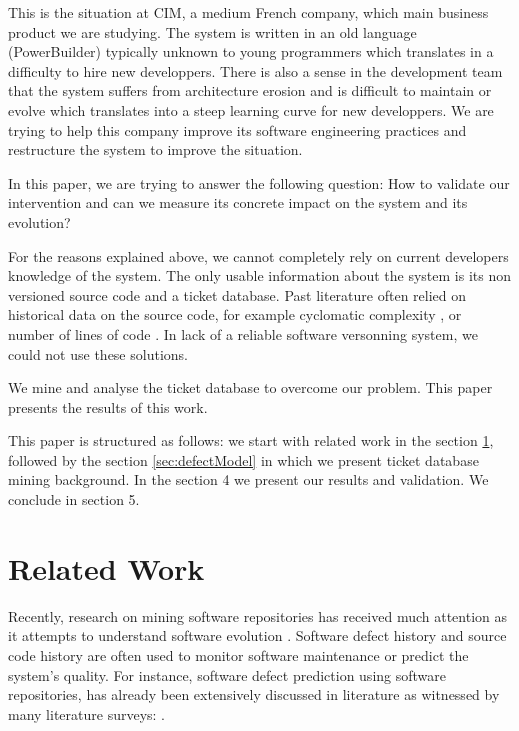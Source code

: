 \documentclass[10pt,conference]{IEEEtran}
\begin{document}
This is the situation at CIM, a medium French company, which main business product we are studying.
The system is written in an old language (PowerBuilder) typically unknown to young programmers which translates in a difficulty to hire new developpers.
There is also a sense in the development team that the system suffers from architecture erosion and is difficult to maintain or evolve which translates into a steep learning curve for new developpers.
We are trying to help this company improve its software engineering practices and restructure the system to improve the situation.

In this paper, we are trying to answer the following question:
How to validate our intervention and can we measure its concrete impact on the system and its evolution?

For the reasons explained above, we cannot completely rely on current developers knowledge of the system.
The only usable information about the system is its non versioned source code and a ticket database.
Past literature often relied on historical data on the source code, for example
cyclomatic complexity \cite{gill91}, or number of lines of code \cite{port18}.
In lack of a reliable software versonning system, we could not use these solutions.

We mine and analyse the ticket database to overcome our problem.
This paper presents the results of this work.

 This paper is structured as follows: we start with related work in the section \ref{sec:related-work}, followed by  the section \ref{sec:defectModel}  in which we present ticket database mining background. 
 In the section 4 we present our results and validation. We  conclude in section 5.
 
\section{Related Work}
\label{sec:related-work}
Recently, research on mining software repositories has received much attention as it attempts to  understand  software  evolution \cite{Zhan10a}.
Software defect history and source code history are often used to monitor software maintenance or predict the system's quality. 
For instance, software defect prediction using software repositories, has already been extensively discussed in literature as witnessed by many literature surveys: \cite{Catal09,Hall12,Hoss17,Li19a,malh15}.
\end{document}
